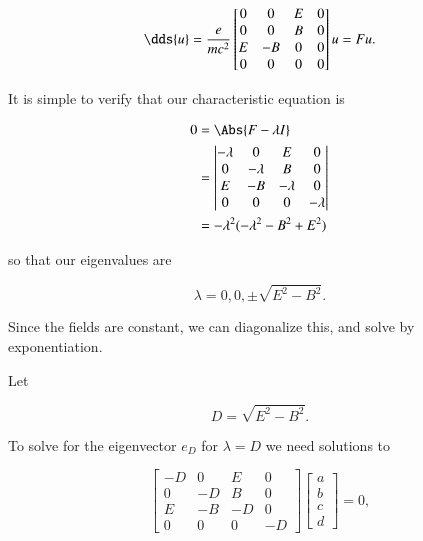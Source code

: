 \begin{equation}\label{eqn:relElectroDynProblemSet2:530}
\dds{u} = 
\frac{ e }{m c^2}
\begin{bmatrix}
0 & 0 & E & 0 \\
0 & 0 & B & 0 \\
E & -B & 0 & 0 \\
0 & 0 & 0 & 0
\end{bmatrix} u = F u.
\end{equation}

It is simple to verify that our characteristic equation is

\begin{align*}
0 
&= \Abs{ F - \lambda I } \\
&= \begin{vmatrix}
-\lambda & 0 & E & 0 \\
0 & -\lambda & B & 0 \\
E & -B & -\lambda & 0 \\
0 & 0 & 0 & -\lambda
\end{vmatrix} \\
&= -\lambda^2 ( -\lambda^2 - B^2 + E^2 )
\end{align*}

so that our eigenvalues are

\begin{equation}\label{eqn:relElectroDynProblemSet2:550}
\lambda = 0, 0, \pm \sqrt{E^2 - B^2}.
\end{equation}

Since the fields are constant, we can diagonalize this, and solve by exponentiation.

Let 

\begin{equation}\label{eqn:relElectroDynProblemSet2:570}
D = \sqrt{E^2 - B^2}.
\end{equation}

To solve for the eigenvector $e_D$ for $\lambda = D$ we need solutions to

\begin{equation}\label{eqn:relElectroDynProblemSet2:590}
\begin{bmatrix}
-D & 0 & E & 0 \\
0 & -D & B & 0 \\
E & -B & -D & 0 \\
0 & 0 & 0 & -D
\end{bmatrix} 
\begin{bmatrix} 
a \\
b \\
c \\
d
\end{bmatrix} 
 = 0,
\end{equation}

